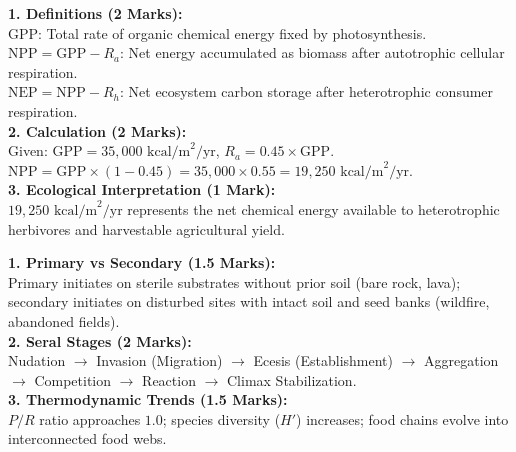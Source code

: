 \begin{solutionbox}
\textbf{1. Definitions (2 Marks):}\\
$\text{GPP}$: Total rate of organic chemical energy fixed by photosynthesis.\\
$\text{NPP} = \text{GPP} - R_a$: Net energy accumulated as biomass after autotrophic cellular respiration.\\
$\text{NEP} = \text{NPP} - R_h$: Net ecosystem carbon storage after heterotrophic consumer respiration.\\
\textbf{2. Calculation (2 Marks):}\\
Given: $\text{GPP} = 35{,}000\text{ kcal/m}^2/\text{yr}$, $R_a = 0.45 \times \text{GPP}$.\\
$\text{NPP} = \text{GPP} \times (1 - 0.45) = 35{,}000 \times 0.55 = 19{,}250\text{ kcal/m}^2/\text{yr}$.\\
\textbf{3. Ecological Interpretation (1 Mark):}\\
$19{,}250\text{ kcal/m}^2/\text{yr}$ represents the net chemical energy available to heterotrophic herbivores and harvestable agricultural yield.
\end{solutionbox}

\begin{solutionbox}
\textbf{1. Primary vs Secondary (1.5 Marks):}\\
Primary initiates on sterile substrates without prior soil (bare rock, lava); secondary initiates on disturbed sites with intact soil and seed banks (wildfire, abandoned fields).\\
\textbf{2. Seral Stages (2 Marks):}\\
Nudation $\to$ Invasion (Migration) $\to$ Ecesis (Establishment) $\to$ Aggregation $\to$ Competition $\to$ Reaction $\to$ Climax Stabilization.\\
\textbf{3. Thermodynamic Trends (1.5 Marks):}\\
$P/R$ ratio approaches $1.0$; species diversity ($H'$) increases; food chains evolve into interconnected food webs.
\end{solutionbox}
\newpage
